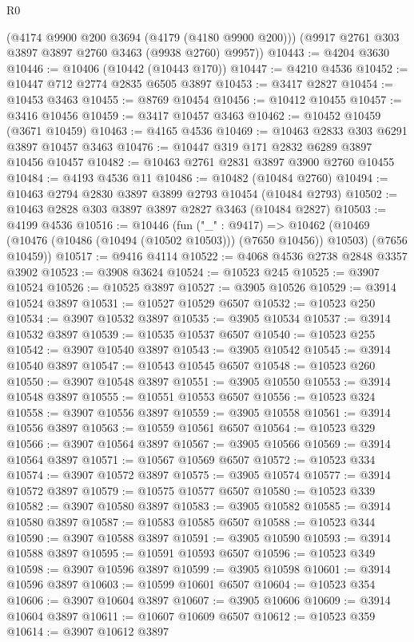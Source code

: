 \begin{lexlean}{R0}
\begin{coremodule}
      (@4174 @9900 @200 @3694 (@4179 (@4180 @9900 @200)))
      (@9917 @2761 @303 @3897 @3897 @2760 @3463 (@9938 @2760) @9957))
@10443 := @4204 @3630
@10446 := @10406 (@10442 (@10443 @170))
@10447 := @4210 @4536
@10452 := @10447 @712 @2774 @2835 @6505 @3897
@10453 := @3417 @2827
@10454 := @10453 @3463
@10455 := @8769 @10454
@10456 := @10412 @10455
@10457 := @3416 @10456
@10459 := @3417 @10457 @3463
@10462 := @10452 @10459 (@3671 @10459)
@10463 := @4165 @4536
@10469 := @10463 @2833 @303 @6291 @3897 @10457 @3463
@10476 := @10447 @319 @171 @2832 @6289 @3897 @10456 @10457
@10482 := @10463 @2761 @2831 @3897 @3900 @2760 @10455
@10484 := @4193 @4536 @11
@10486 := @10482 (@10484 @2760)
@10494 := @10463 @2794 @2830 @3897 @3899 @2793 @10454 (@10484 @2793)
@10502 := @10463 @2828 @303 @3897 @3897 @2827 @3463 (@10484 @2827)
@10503 := @4199 @4536
@10516 := @10446
    (fun ("_" : @9417) =>
    @10462 (@10469 (@10476 (@10486 (@10494 (@10502 @10503))) (@7650 @10456)) @10503) (@7656 @10459))
@10517 := @9416 @4114
@10522 := @4068 @4536 @2738 @2848 @3357 @3902
@10523 := @3908 @3624
@10524 := @10523 @245
@10525 := @3907 @10524
@10526 := @10525 @3897
@10527 := @3905 @10526
@10529 := @3914 @10524 @3897
@10531 := @10527 @10529 @6507
@10532 := @10523 @250
@10534 := @3907 @10532 @3897
@10535 := @3905 @10534
@10537 := @3914 @10532 @3897
@10539 := @10535 @10537 @6507
@10540 := @10523 @255
@10542 := @3907 @10540 @3897
@10543 := @3905 @10542
@10545 := @3914 @10540 @3897
@10547 := @10543 @10545 @6507
@10548 := @10523 @260
@10550 := @3907 @10548 @3897
@10551 := @3905 @10550
@10553 := @3914 @10548 @3897
@10555 := @10551 @10553 @6507
@10556 := @10523 @324
@10558 := @3907 @10556 @3897
@10559 := @3905 @10558
@10561 := @3914 @10556 @3897
@10563 := @10559 @10561 @6507
@10564 := @10523 @329
@10566 := @3907 @10564 @3897
@10567 := @3905 @10566
@10569 := @3914 @10564 @3897
@10571 := @10567 @10569 @6507
@10572 := @10523 @334
@10574 := @3907 @10572 @3897
@10575 := @3905 @10574
@10577 := @3914 @10572 @3897
@10579 := @10575 @10577 @6507
@10580 := @10523 @339
@10582 := @3907 @10580 @3897
@10583 := @3905 @10582
@10585 := @3914 @10580 @3897
@10587 := @10583 @10585 @6507
@10588 := @10523 @344
@10590 := @3907 @10588 @3897
@10591 := @3905 @10590
@10593 := @3914 @10588 @3897
@10595 := @10591 @10593 @6507
@10596 := @10523 @349
@10598 := @3907 @10596 @3897
@10599 := @3905 @10598
@10601 := @3914 @10596 @3897
@10603 := @10599 @10601 @6507
@10604 := @10523 @354
@10606 := @3907 @10604 @3897
@10607 := @3905 @10606
@10609 := @3914 @10604 @3897
@10611 := @10607 @10609 @6507
@10612 := @10523 @359
@10614 := @3907 @10612 @3897

\end{coremodule}
\end{lexlean}
